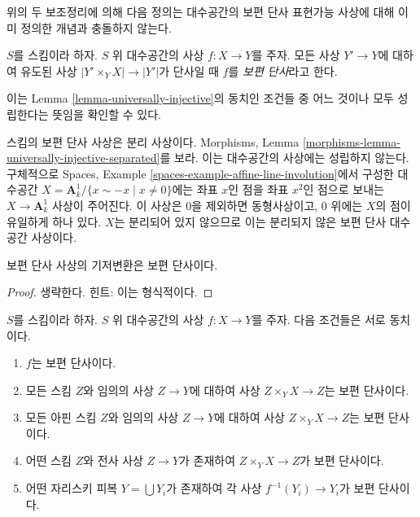 \noindent
위의 두 보조정리에 의해 다음 정의는 대수공간의 보편 단사 표현가능
사상에 대해 이미 정의한 개념과 충돌하지 않는다.

\begin{definition}
\label{definition-universally-injective}
$S$를 스킴이라 하자. $S$ 위 대수공간의 사상
$f : X \to Y$를 주자. 모든 사상 $Y' \to Y$에 대하여 유도된 사상
$|Y' \times_Y X| \to |Y'|$가 단사일 때 $f$를 {\it 보편 단사}라고
한다.
\end{definition}

\noindent
이는 Lemma \ref{lemma-universally-injective}의 동치인 조건들 중
어느 것이나 모두 성립한다는 뜻임을 확인할 수 있다.

\begin{remark}
\label{remark-universally-injective-not-separated}
스킴의 보편 단사 사상은 분리 사상이다. Morphisms, Lemma
\ref{morphisms-lemma-universally-injective-separated}를 보라.
이는 대수공간의 사상에는 성립하지 않는다. 구체적으로
Spaces, Example \ref{spaces-example-affine-line-involution}에서
구성한 대수공간
$X = \mathbf{A}^1_k/\{x \sim -x \mid x \not = 0\}$에는
좌표 $x$인 점을 좌표 $x^2$인 점으로 보내는
$X \to \mathbf{A}^1_k$ 사상이 주어진다.
이 사상은 $0$을 제외하면 동형사상이고, $0$ 위에는 $X$의 점이
유일하게 하나 있다. $X$는 분리되어 있지 않으므로 이는 분리되지
않은 보편 단사 대수공간 사상이다.
\end{remark}

\begin{lemma}
\label{lemma-base-change-universally-injective}
보편 단사 사상의 기저변환은 보편 단사이다.
\end{lemma}

\begin{proof}
생략한다. 힌트: 이는 형식적이다.
\end{proof}

\begin{lemma}
\label{lemma-universally-injective-local}
$S$를 스킴이라 하자.
$S$ 위 대수공간의 사상 $f : X \to Y$를 주자.
다음 조건들은 서로 동치이다.
\begin{enumerate}
\item $f$는 보편 단사이다.
\item 모든 스킴 $Z$와 임의의 사상 $Z \to Y$에 대하여 사상
$Z \times_Y X \to Z$는 보편 단사이다.
\item 모든 아핀 스킴 $Z$와 임의의 사상
$Z \to Y$에 대하여 사상 $Z \times_Y X \to Z$는 보편 단사이다.
\item 어떤 스킴 $Z$와 전사 사상 $Z \to Y$가 존재하여
$Z \times_Y X \to Z$가 보편 단사이다.
\item 어떤 자리스키 피복 $Y = \bigcup Y_i$가 존재하여
각 사상 $f^{-1}(Y_i) \to Y_i$가 보편 단사이다.
\end{enumerate}
\end{lemma}

